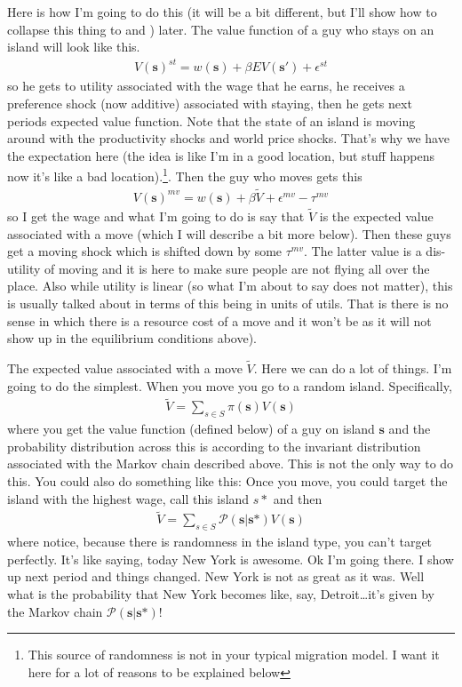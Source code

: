 \documentclass[pdftex,12pt]{article}
\begin{document}
\medskip
\noindent Here is how I'm going to do this (it will be a bit different, but I'll show how to collapse this thing to \citet{caliendo2015trade} and \citet{artucc2010trade}) later. The value function of a guy who stays on an island will look like this.
\begin{align}
V(\textbf{s})^{st} = w(\textbf{s}) + \beta E V(\textbf{s}') + \epsilon^{st}
\label{eq:expected_utility_stay}
\end{align}
so he gets to utility associated with the wage that he earns, he receives a preference shock (now additive) associated with staying, then he gets next periods expected value function. Note that the state of an island is moving around with the productivity shocks and world price shocks. That's why we have the expectation here (the idea is like I'm in a good location, but stuff happens now it's like a bad location).\footnote{This source of randomness is not in your typical migration model. I want it here for a lot of reasons to be explained below}. Then the guy who moves gets this
\begin{align}
V(\textbf{s})^{mv} = w(\textbf{s}) + \beta \tilde V + \epsilon^{mv} - \tau^{mv}
\label{eq:expected_utility_move}
\end{align}
so I get the wage and what I'm going to do is say that $\tilde V$ is the expected value associated with a move (which I will describe a bit more below). Then these guys get a moving shock which is shifted down by some $\tau^{mv}$. The latter value is a dis-utility of moving and it is here to make sure people are not flying all over the place. Also while utility is linear (so what I'm about to say does not matter), this is usually talked about in terms of this being in units of utils. That is there is no sense in which there is a resource cost of a move and it won't be as it will not show up in the equilibrium conditions above). 

\medskip
\noindent The expected value associated with a move $\tilde V$. Here we can do a lot of things. I'm going to do the simplest. When you move you go to a random island. Specifically, 
\begin{align}
\tilde V = \sum_{s \in S} \pi(\textbf{s}) V(\textbf{s})
\end{align}
where you get the value function (defined below) of a guy on island $\textbf{s}$ and the probability distribution across this is according to the invariant distribution associated with the Markov chain described above. This is not the only way to do this. You could also do something like this: Once you move, you could target the island with the highest wage, call this island $s*$ and then 
\begin{align}
\tilde V = \sum_{s \in S} \mathcal{P}(\textbf{s} | \textbf{s*}) V(\textbf{s})
\end{align}
where notice, because there is randomness in the island type, you can't target perfectly. It's like saying, today New York is awesome. Ok I'm going there. I show up next period and things changed. New York is not as great as it was. Well what is the probability that New York becomes like, say, Detroit\ldots it's given by the Markov chain $\mathcal{P}(\textbf{s} | \textbf{s*})$!
\end{document}
